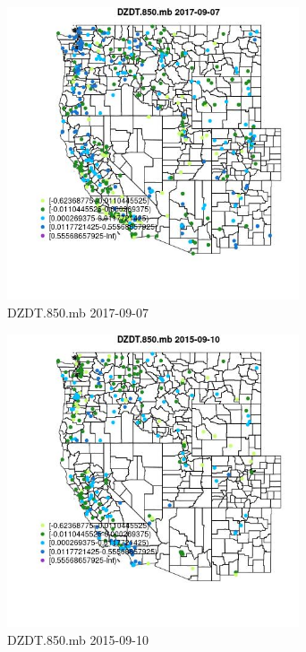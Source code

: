 \begin{figure} 
\centering  
\includegraphics[width=0.77\textwidth]{Code_Outputs/Report_ML_input_PM25_Step4_part_e_de_duplicated_aves_compiled_2019-05-20wNAs_MapObsDZDT850mb2017-09-07.jpg} 
\caption{\label{fig:Report_ML_input_PM25_Step4_part_e_de_duplicated_aves_compiled_2019-05-20wNAsMapObsDZDT850mb2017-09-07}DZDT.850.mb 2017-09-07} 
\end{figure} 
 

\begin{figure} 
\centering  
\includegraphics[width=0.77\textwidth]{Code_Outputs/Report_ML_input_PM25_Step4_part_e_de_duplicated_aves_compiled_2019-05-20wNAs_MapObsDZDT850mb2015-09-10.jpg} 
\caption{\label{fig:Report_ML_input_PM25_Step4_part_e_de_duplicated_aves_compiled_2019-05-20wNAsMapObsDZDT850mb2015-09-10}DZDT.850.mb 2015-09-10} 
\end{figure} 
 

